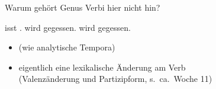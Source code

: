 \begin{frame}
  {Warum gehört Genus Verbi hier nicht hin?}
  \pause
  \begin{exe}
    \ex
    \begin{xlist}
      \ex {} \alert{isst} .
      \pause
      \ex {} \alert{wird} \alert{gegessen}.
      \pause
      \ex {} \alert{wird}  \alert{gegessen}.
    \end{xlist}
  \end{exe}
  \pause
  \Zeile
  \begin{itemize}[<+->]
    \item {} (wie analytische Tempora)
    \item eigentlich eine \alert{lexikalische} Änderung am Verb\\
      (Valenzänderung und Partizipform, s.\ ca.\ Woche 11)
  \end{itemize}
\end{frame}


